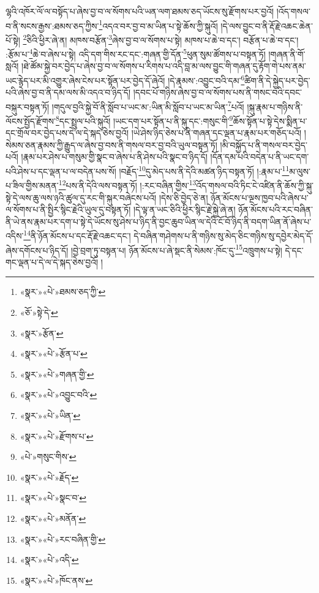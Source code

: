 ལྷའི་འཁོར་ལོ་ལ་བསྟོད་པ་ཞེས་བྱ་བ་ལ་སོགས་པའི་ཡན་ལག་ཐམས་ཅད་ཡོངས་སུ་རྫོགས་པར་བྱའོ། །འོད་གསལ་བ་ནི་སངས་རྒྱས་:ཐམས་ཅད་ཀྱིས་\footnote{«སྣར་»«པེ་»ཐམས་ཅད་ཀྱི་}འདའ་བར་བྱ་བ་མ་ཡིན་པ་སྟེ་ཆོས་ཀྱི་སྐུའོ། །དེ་ལས་བྱུང་བ་ནི་རྡོ་རྗེ་འཆང་ཆེན་པོ་སྟེ། \footnote{«ཅོ་»སྟེ་དེ་}ཅིའི་ཕྱིར་ཞེ་ན། མཁས་བརྩོན་\footnote{«སྣར་»རྩོན་}ཞེས་བྱ་བ་ལ་སོགས་པ་སྟེ། མཁས་པ་ཆེ་བ་དང་། བརྩོན་པ་ཆེ་བ་དང་། :རྩོམ་པ་\footnote{«སྣར་»«པེ་»རྩོན་པ་}ཆེ་བ་ཞེས་པ་སྟེ། འདི་དག་གིས་རང་དང་:གཞན་གྱི་དོན་\footnote{«སྣར་»«པེ་»གཞན་གྱི་}ཕུན་སུམ་ཚོགས་པ་བསྟན་ཏོ། །གཞན་ནི་གོ་སླའོ། །ཐེ་ཚོམ་སྐྱེ་བར་བྱེད་པ་ཞེས་བྱ་བ་ལ་སོགས་པ་རིགས་པ་འདི་བླ་མ་ལས་བྱུང་གི་གཞན་དུ་རྟོག་གེ་པས་ནམ་ཡང་རྙེད་པར་མི་འགྱུར་ཞེས་ངེས་པར་སྟོན་པར་བྱེད་དོ་ཞེའོ། །དེ་རྣམས་:འབྱུང་བའི་དམ་\footnote{«སྣར་»«པེ་»འབྱུང་བའི་}ཚིག་ནི་དེ་སྐྱེད་པར་བྱེད་པའི་ཞེས་བྱ་བ་ནི་དམ་ལས་མི་འདའ་བ་ཉིད་དོ། །དབང་པོ་གཉིས་ཞེས་བྱ་བ་ལ་སོགས་པས་ནི་གསང་བའི་དབང་བསྐུར་བསྟན་ཏོ། །གདུལ་བྱའི་སྐྱེ་བོ་ནི་སློབ་པ་ཡང་མ་:ཡིན་མི་སློབ་པ་ཡང་མ་ཡིན་\footnote{«སྣར་»«པེ་»ཡིན་}པའོ། །སྐུ་རྣམ་པ་གཉིས་ནི་ལོངས་སྤྱོད་རྫོགས་\footnote{«སྣར་»«པེ་»རྫོགས་པ་}དང་སྤྲུལ་པའི་སྐུའོ། །ཡང་དག་པར་སྟོན་པ་ནི་སྐུ་དང་:གསུང་གི་\footnote{«པེ་»གསུང་གིས་}ཆོས་སྟོན་པ་སྟེ་དེས་སྨིན་པ་དང་གྲོལ་བར་བྱེད་པས་དེ་ལ་དེ་སྐད་ཅེས་བྱའོ། །ཡེ་ཤེས་ཉིད་ཅེས་པ་ནི་གཞན་དང་ལྡན་པ་རྣམ་པར་གཅོད་པའོ། །སེམས་ཅན་རྣམས་ཀྱི་རྒྱུད་ལ་ཞེས་བྱ་བས་ནི་གསལ་བར་བྱ་བའི་ཡུལ་བསྟན་ཏོ། །མི་བསྐྱོད་པ་ནི་གསལ་བར་བྱེད་པའོ། །རྣམ་པར་ཤེས་པ་གསུམ་གྱི་སྣང་བ་ཞེས་པ་ནི་ཤེས་པའི་སྣང་བ་ཉིད་དོ། །དོན་དམ་པའི་བདེན་པ་ནི་ཡང་དག་པའི་ཤེས་པ་དང་ལྡན་པ་ལ་བདེན་པས་སོ། །བརྗོད་\footnote{«སྣར་»«པེ་»རྗོད་}དུ་མེད་པས་ནི་དེའི་མཚན་ཉིད་བསྟན་ཏོ། །:རྣམ་པ་\footnote{«སྣར་»«པེ་»སྣང་བ་}མ་ལུས་པ་ཟིལ་གྱིས་མནན་\footnote{«སྣར་»«པེ་»མནོན་}པས་ནི་དེའི་ལས་བསྟན་ཏོ། །:རང་བཞིན་གྱིས་\footnote{«སྣར་»«པེ་»རང་བཞིན་གྱི་}འོད་གསལ་བའི་ཏིང་ངེ་འཛིན་ནི་ཆོས་ཀྱི་སྐུ་སྟེ་དེ་ལས་ཆུ་ལས་ཉའི་ཚུལ་དུ་རང་གི་སྐུར་བཞེངས་པའོ། །དེས་ཅི་བྱེད་ཅེ་ན། ཉོན་མོངས་པ་ལྔས་ཁྱབ་པའི་ཞེས་པ་ལ་སོགས་པ་ནི་སྤྱིར་སྙིང་རྗེའི་ཡུལ་དུ་བསྟན་ཏོ། །དེ་ལྟ་ན་ཡང་ཅིའི་ཕྱིར་སྙིང་རྗེ་སྐྱེ་ཞེ་ན། ཉོན་མོངས་པའི་རང་བཞིན་ནི་ཡེ་ནས་རྣམ་པར་དག་པ་སྟེ་དེ་ཡོངས་སུ་ཤེས་པ་ཉིད་ནི་བྱང་ཆུབ་ཡིན་ལ་དེའི་ངོ་བོ་ཉིད་ནི་བདག་ཡིན་ནོ་ཞེས་པ་འདིས་\footnote{«སྣར་»«པེ་»འདི་}ནི་ཉོན་མོངས་པ་དང་རྡོ་རྗེ་འཆང་དང་། དེ་བཞིན་གཤེགས་པ་ནི་གཉིས་སུ་མེད་ཅིང་གཉིས་སུ་དབྱེར་མེད་དོ་ཞེས་དགོངས་པ་ཉིད་དོ། །བྱེ་བྲག་ཏུ་བསྟན་པ། ཉོན་མོངས་པ་ཞེ་སྡང་ནི་སེམས་:ཁོང་དུ་\footnote{«སྣར་»«པེ་»ཁོང་ནས་}འཁྲུགས་པ་སྟེ། དེ་དང་གང་ལྡན་པ་དེ་ལ་དེ་སྐད་ཅེས་བྱའོ། །
